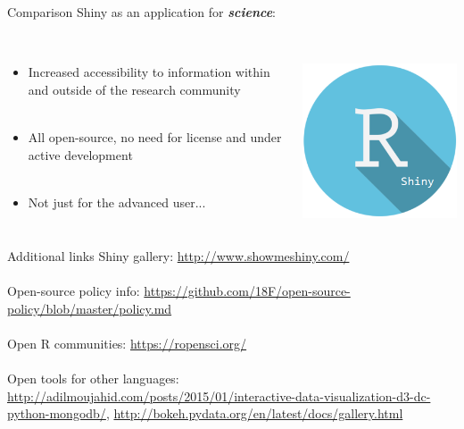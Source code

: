 \documentclass[serif]{beamer}\usepackage[]{graphicx}\usepackage[]{color}
\newcommand{\emtxt}[1]{\textbf{\textit{#1}}}
\begin{document}
\begin{frame}{Comparison}
Shiny as an application for \emtxt{science}:\\~\\
\begin{columns}
\begin{column}{0.8\textwidth}
\begin{itemize}
\item Increased accessibility to information within and outside of the research community \\~\\
\item All open-source, no need for license and under active development \\~\\
\item Not just for the advanced user...
\end{itemize}
\end{column}
\begin{column}{0.2\textwidth}
\centerline{\includegraphics[width = \textwidth]{fig/shiny_logo.png}}
\end{column}
\end{columns}
\vspace{0.16in}
\end{frame}

\begin{frame}{Additional links}
Shiny gallery: \url{http://www.showmeshiny.com/} \\~\\
Open-source policy info: \url{https://github.com/18F/open-source-policy/blob/master/policy.md} \\~\\
Open R communities: \url{https://ropensci.org/} \\~\\
Open tools for other languages:  \url{http://adilmoujahid.com/posts/2015/01/interactive-data-visualization-d3-dc-python-mongodb/}, \url{http://bokeh.pydata.org/en/latest/docs/gallery.html}
\end{frame}
\end{document}
